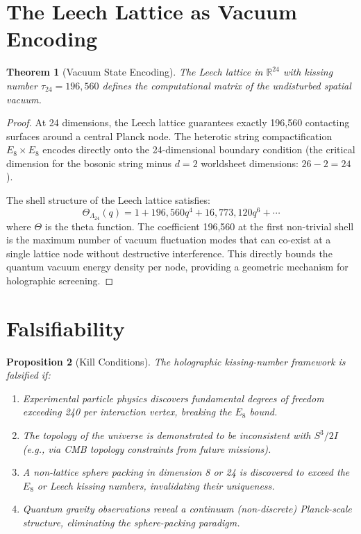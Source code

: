 \documentclass[12pt, a4paper]{article}
\theoremstyle{plain}
\newtheorem{theorem}{Theorem}[section]
\newtheorem{proposition}[theorem]{Proposition}
\theoremstyle{definition}
\theoremstyle{remark}
\begin{document}
\section{The Leech Lattice as Vacuum Encoding}\label{sec:leech}

\begin{theorem}[Vacuum State Encoding]
The Leech lattice in $\mathbb{R}^{24}$ with kissing number $\tau_{24} = 196{,}560$ defines the computational matrix of the undisturbed spatial vacuum.
\end{theorem}

\begin{proof}
At 24 dimensions, the Leech lattice guarantees exactly 196,560 contacting surfaces around a central Planck node. The heterotic string compactification $E_8 \times E_8$ encodes directly onto the 24-dimensional boundary condition (the critical dimension for the bosonic string minus $d=2$ worldsheet dimensions: $26-2=24$).

The shell structure of the Leech lattice satisfies:
\begin{equation}
    \Theta_{\Lambda_{24}}(q) = 1 + 196{,}560 q^4 + 16{,}773{,}120 q^6 + \cdots
\end{equation}
where $\Theta$ is the theta function. The coefficient 196,560 at the first non-trivial shell is the maximum number of vacuum fluctuation modes that can co-exist at a single lattice node without destructive interference. This directly bounds the quantum vacuum energy density per node, providing a geometric mechanism for holographic screening.
\end{proof}

\section{Falsifiability}\label{sec:falsifiability}

\begin{proposition}[Kill Conditions]
The holographic kissing-number framework is falsified if:
\begin{enumerate}
    \item Experimental particle physics discovers fundamental degrees of freedom exceeding 240 per interaction vertex, breaking the $E_8$ bound.
    \item The topology of the universe is demonstrated to be inconsistent with $S^3/2I$ (e.g., via CMB topology constraints from future missions).
    \item A non-lattice sphere packing in dimension 8 or 24 is discovered to exceed the $E_8$ or Leech kissing numbers, invalidating their uniqueness.
    \item Quantum gravity observations reveal a continuum (non-discrete) Planck-scale structure, eliminating the sphere-packing paradigm.
\end{enumerate}
\end{proposition}
\end{document}
